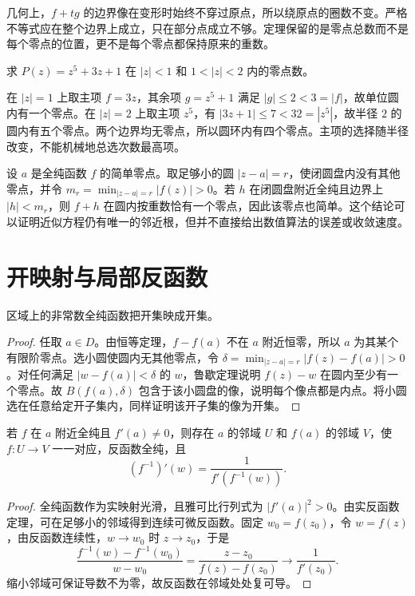 几何上，$f+tg$ 的边界像在变形时始终不穿过原点，所以绕原点的圈数不变。严格不等式应在整个边界上成立，只在部分点成立不够。定理保留的是零点总数而不是每个零点的位置，更不是每个零点都保持原来的重数。

\begin{example}[不用求根公式判断根的位置]
求 $P(z)=z^5+3z+1$ 在 $|z|<1$ 和 $1<|z|<2$ 内的零点数。
\end{example}
\begin{solve}
在 $|z|=1$ 上取主项 $f=3z$，其余项 $g=z^5+1$ 满足 $|g|\le2<3=|f|$，故单位圆内有一个零点。在 $|z|=2$ 上取主项 $z^5$，有 $|3z+1|\le7<32=|z^5|$，故半径 $2$ 的圆内有五个零点。两个边界均无零点，所以圆环内有四个零点。主项的选择随半径改变，不能机械地总选次数最高项。
\end{solve}

\begin{example}[简单根在小扰动下的稳定性]
设 $a$ 是全纯函数 $f$ 的简单零点。取足够小的圆 $|z-a|=r$，使闭圆盘内没有其他零点，并令 $m_r=\min_{|z-a|=r}|f(z)|>0$。若 $h$ 在闭圆盘附近全纯且边界上 $|h|<m_r$，则 $f+h$ 在圆内按重数恰有一个零点，因此该零点也简单。这个结论可以证明近似方程仍有唯一的邻近根，但并不直接给出数值算法的误差或收敛速度。
\end{example}

\section{开映射与局部反函数}

\begin{theorem}[开映射定理]
\label{thm:ca-open-map}
区域上的非常数全纯函数把开集映成开集。
\end{theorem}
\begin{proof}
任取 $a\in D$。由恒等定理，$f-f(a)$ 不在 $a$ 附近恒零，所以 $a$ 为其某个有限阶零点。选小圆使圆内无其他零点，令 $\delta=\min_{|z-a|=r}|f(z)-f(a)|>0$。对任何满足 $|w-f(a)|<\delta$ 的 $w$，鲁歇定理说明 $f(z)-w$ 在圆内至少有一个零点。故 $B(f(a),\delta)$ 包含于该小圆盘的像，说明每个像点都是内点。将小圆选在任意给定开子集内，同样证明该开子集的像为开集。
\end{proof}

\begin{theorem}[全纯反函数定理]
\label{thm:ca-inverse}
若 $f$ 在 $a$ 附近全纯且 $f'(a)\ne0$，则存在 $a$ 的邻域 $U$ 和 $f(a)$ 的邻域 $V$，使 $f:U\to V$ 一一对应，反函数全纯，且
\[
 (f^{-1})'(w)=\frac1{f'(f^{-1}(w))}.
\]
\end{theorem}
\begin{proof}
全纯函数作为实映射光滑，且雅可比行列式为 $|f'(a)|^2>0$。由实反函数定理，可在足够小的邻域得到连续可微反函数。固定 $w_0=f(z_0)$，令 $w=f(z)$，由反函数连续性，$w\to w_0$ 时 $z\to z_0$，于是
\[
 \frac{f^{-1}(w)-f^{-1}(w_0)}{w-w_0}
 =\frac{z-z_0}{f(z)-f(z_0)}\longrightarrow\frac1{f'(z_0)}.
\]
缩小邻域可保证导数不为零，故反函数在邻域处处复可导。
\end{proof}

